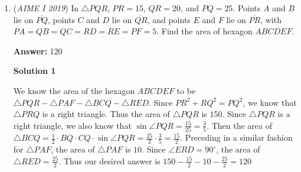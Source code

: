 \begin{enumerate}
 -josephwidjaja

 



\textbf{Solution 7 (Official MAA)}

There are $\tbinom{20}{2}=190$ equally likely pairs $\{J,B\}$. In $19$ of these pairs $(\{1,2\},\{2,3\},\{3,4\}\dots,\{19,20\})$, the numbers differ by less than 2, so the probability that the numbers differ by at least 2 is $1-\frac{19}{190}=\frac9{10}$. Then $B-J\ge 2$ holds in exactly half of these cases, so it has probability $\frac12\cdot\frac9{10}=\frac{9}{20}$. The requested sum is $9+20=\boxed{029}$.

 



\textbf{Solution 8 (Compliment Count)}

Impose the compliment.

 There are $20 \cdot 19 = 380$ possible ordered pairs $(J,B)$. We wish to find all $(J,B):~B - J < 2$. That only happens if either $B - J = 1$ or $B < J$, but never $B = J$ as that contradicts $B \neq J \in \{1,2,3,\dots,20\}$. Then, for $J=1$, $B = 2$, for $J = 2$, $B = 1,3$, and for all $J = k~:~1\le k \le 19$, if $C(B)$ denotes the number of possible $B$ given $J$, $C(B) = k$. Then, for the special $k=20$, we see only 19 values works.

 The requested compliment is then $\frac{1+2+3+\dots+19 +19}{380} = \frac{209}{380} = \frac{11}{20}$. The requested probability is $1 - \frac{11}{20} = \frac{9}{20} \implies \boxed{029}$.

 


	\item (\textit{AIME I 2019}) In $\triangle PQR$, $PR=15$, $QR=20$, and $PQ=25$. Points $A$ and $B$ lie on $\overline{PQ}$, points $C$ and $D$ lie on $\overline{QR}$, and points $E$ and $F$ lie on $\overline{PR}$, with $PA=QB=QC=RD=RE=PF=5$. Find the area of hexagon $ABCDEF$.


 
 \textbf{Answer: }120



\textbf{Solution 1}

We know the area of the hexagon $ABCDEF$ to be $\triangle PQR- \triangle PAF- \triangle BCQ- \triangle RED$. Since $PR^2+RQ^2=PQ^2$, we know that $\triangle PRQ$ is a right triangle. Thus the area of $\triangle PQR$ is $150$. Since $\triangle PQR$ is a right triangle, we also know that $\sin \angle PQR = \frac{15}{25} = \frac{3}{5}$. Then the area of $\triangle BCQ = \frac12 \cdot BQ \cdot CQ \cdot \sin \angle PQR= \frac{25}{2}\cdot \frac{3}{5}=\frac{15}{2}$. Preceding in a similar fashion for $\triangle PAF$, the area of $\triangle PAF$ is $10$. Since $\angle ERD = 90^{\circ}$, the area of $\triangle RED=\frac{25}{2}$. Thus our desired answer is $150-\frac{15}{2}-10-\frac{25}{2}=\boxed{120}$





\end{enumerate}
